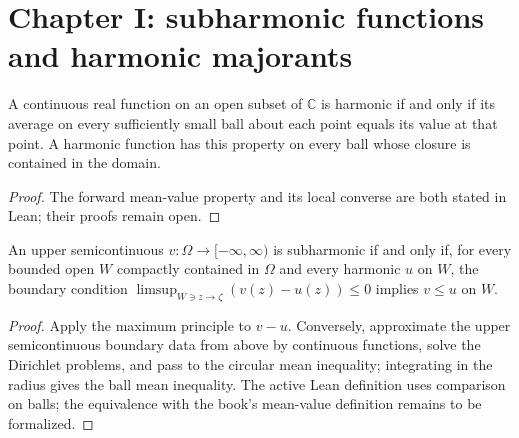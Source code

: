 \section{Chapter I: subharmonic functions and harmonic majorants}

\begin{theorem}
  \label{thm:harmonic_mean_value}
  \leanok
  A continuous real function on an open subset of $\mathbb C$ is harmonic
  if and only if its average on every sufficiently small ball about each
  point equals its value at that point. A harmonic function has this property
  on every ball whose closure is contained in the domain.
  \begin{proof}
    \notready
    The forward mean-value property and its local converse are both stated
    in Lean; their proofs remain open.
  \end{proof}
\end{theorem}

\begin{theorem}
  \label{thm:I_6_3}
  \leanok
  An upper semicontinuous $v:\Omega\to[-\infty,\infty)$ is subharmonic if
  and only if, for every bounded open $W$ compactly contained in $\Omega$
  and every harmonic $u$ on $W$, the boundary condition
  $\limsup_{W\ni z\to\zeta}(v(z)-u(z))\le0$ implies $v\le u$ on $W$.
  \begin{proof}
    \notready
    Apply the maximum principle to $v-u$. Conversely, approximate the
    upper semicontinuous boundary data from above by continuous functions,
    solve the Dirichlet problems, and pass to the circular mean inequality;
    integrating in the radius gives the ball mean inequality.
    The active Lean definition uses comparison on balls; the equivalence
    with the book's mean-value definition remains to be formalized.
  \end{proof}
\end{theorem}

